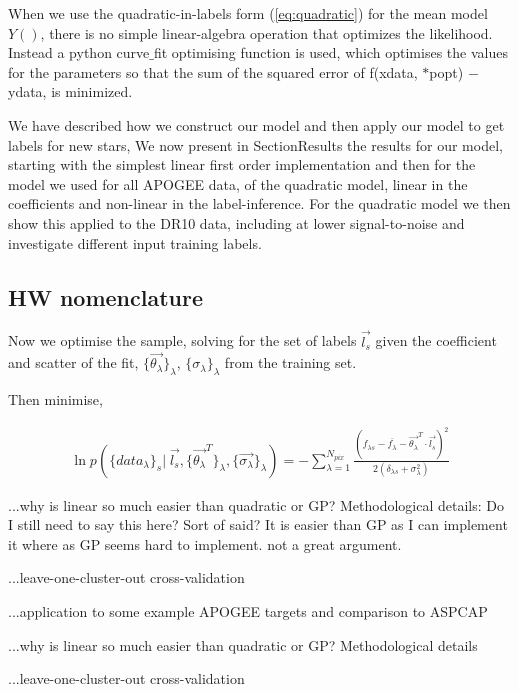 \documentclass[12pt, preprint]{aastex}
\newcommand{\sectionname}{Section}
\newcommand{\mean}[1]{\overline{#1}}
\begin{document}
When we use the quadratic-in-labels form (\ref{eq:quadratic}) for the
mean model $Y()$, there is no simple linear-algebra operation that
optimizes the likelihood. Instead a python curve$\_$fit optimising function is used, which optimises the values for the parameters so that the sum of the squared error of f(xdata, $*$popt) $-$ ydata,  is minimized. 

We have described how we construct our model and then apply our model to get labels for new stars, We now present in \sectionname{Results} the results for our model, starting with the simplest linear first order implementation and then for the model we used for all APOGEE data, of the quadratic model, linear in the coefficients and non-linear in the label-inference.  For the quadratic model we then show this applied to the DR10 data, including at lower signal-to-noise and investigate different input training labels. 

\subsection{HW nomenclature}

Now we optimise the sample, solving for the set of labels $\vec{l_s}$ given the coefficient and scatter of the fit, $ \{ \vec{\theta_\lambda} \}_\lambda $, 
$\{ \sigma_\lambda \}_\lambda$ from the training set. 

Then minimise, 

 \begin{eqnarray}
\ln p ( \{ data_\lambda \}_s | \; \vec{l_s}, \{ \vec{\theta_\lambda }^T \}_\lambda, \{ \vec{\sigma_\lambda }\}_\lambda )  = 
- \sum\limits_{\lambda=1}^{N_{pix}}  \frac{(f_{\lambda s } - \mean{f_\lambda} - \vec{\theta_\lambda }^T  \cdot \vec{l_s})^2} {2(\delta_{\lambda s} + \sigma_\lambda^{2})}
\end{eqnarray}


...why is linear so much easier than quadratic or GP?  Methodological details: Do I still need to say this here? Sort of said? It is easier than GP as I can implement it where as GP seems hard to implement. not a great argument. 

...leave-one-cluster-out cross-validation

...application to some example APOGEE targets and comparison to ASPCAP

...why is linear so much easier than quadratic or GP?  Methodological details

...leave-one-cluster-out cross-validation
\end{document}
